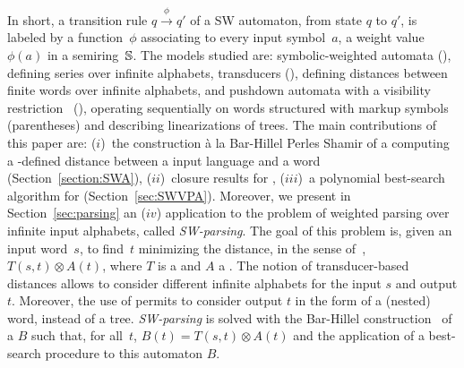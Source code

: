 \noindent
In short, a transition rule $q \xrightarrow{\phi} q'$ of a SW automaton, 
from state $q$ to $q'$,
is labeled by a function~$\phi$ associating to every input symbol~$a$, a weight value~$\phi(a)$
in a semiring~$\mathbb{S}$.
%
The models studied are: 
symbolic-weighted automata (\SWA),
defining series over infinite alphabets, 
transducers (\SWT), 
defining distances between finite words over infinite alphabets, %
and pushdown automata with a visibility restriction~\cite{AlurMadhusudan09nested} (\SWVPA),
operating sequentially on %
words structured with markup symbols (parentheses) and describing linearizations of trees.
%
The main contributions of this paper are:
($i$)~the construction à la Bar-Hillel Perles Shamir of a \SWA
     computing a \SWT-defined distance between a \SWA input language and a word (Section~\ref{section:SWA}), 
($ii$)~closure results for \SWVPA, 
($iii$)~a polynomial best-search algorithm for \SWVPA (Section~\ref{sec:SWVPA}). %
Moreover, we present in Section~\ref{sec:parsing} an 
($iv$) application to the problem of weighted parsing over infinite input alphabets, 
called \emph{SW-parsing}. 
%
The goal of this problem is, given an input word~$s$, 
to find~$t$ minimizing the distance, in the sense of~\cite{Mohri03ijfcs}, 
$T(s, t) \otimes A(t)$, where $T$ is a \SWT and $A$ a \SWVPA.
The notion of transducer-based distances allows to consider 
different infinite alphabets for the input $s$ and output $t$.
Moreover, the use of \SWVPA permits to consider output $t$ in the form of a (nested) word, instead of a tree.
\emph{SW-parsing} is solved with the Bar-Hillel construction~\cite{NederhofSatta03ParsingIntersection} 
of a \SWVPA $B$ such that, for all~$t$, $B(t) = T(s, t) \otimes A(t)$
and the application of a best-search procedure to this automaton $B$.

